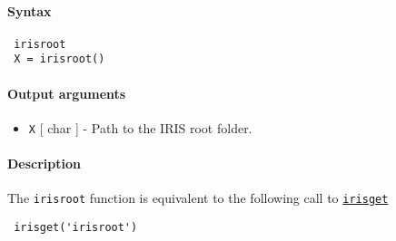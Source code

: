 


	\paragraph{Syntax}
 
 \begin{verbatim}
 irisroot
 X = irisroot()
 \end{verbatim}
 
 \paragraph{Output arguments}
 
 \begin{itemize}
 \item
   \texttt{X} {[} char {]} - Path to the IRIS root folder.
 \end{itemize}
 
 \paragraph{Description}
 
 The \texttt{irisroot} function is equivalent to the following call to
 \href{config/irisget}{\texttt{irisget}}
 
 \begin{verbatim}
 irisget('irisroot')
 \end{verbatim}


